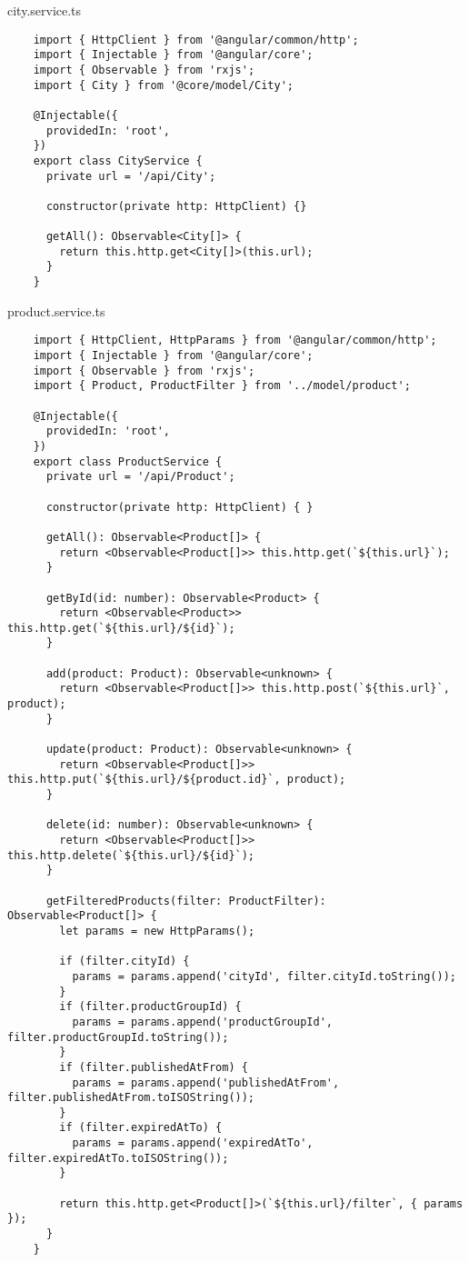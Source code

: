 city.service.ts
\begin{lstlisting}
    import { HttpClient } from '@angular/common/http';
    import { Injectable } from '@angular/core';
    import { Observable } from 'rxjs';
    import { City } from '@core/model/City';
    
    @Injectable({
      providedIn: 'root',
    })
    export class CityService {
      private url = '/api/City';
    
      constructor(private http: HttpClient) {}
    
      getAll(): Observable<City[]> {
        return this.http.get<City[]>(this.url);
      }
    }
\end{lstlisting}

product.service.ts
\begin{lstlisting}
    import { HttpClient, HttpParams } from '@angular/common/http';
    import { Injectable } from '@angular/core';
    import { Observable } from 'rxjs';
    import { Product, ProductFilter } from '../model/product';
    
    @Injectable({
      providedIn: 'root',
    })
    export class ProductService {
      private url = '/api/Product';
    
      constructor(private http: HttpClient) { }
    
      getAll(): Observable<Product[]> {
        return <Observable<Product[]>> this.http.get(`${this.url}`);
      }
    
      getById(id: number): Observable<Product> {
        return <Observable<Product>> this.http.get(`${this.url}/${id}`);
      }
    
      add(product: Product): Observable<unknown> {
        return <Observable<Product[]>> this.http.post(`${this.url}`, product);
      }
    
      update(product: Product): Observable<unknown> {
        return <Observable<Product[]>> this.http.put(`${this.url}/${product.id}`, product);
      }
    
      delete(id: number): Observable<unknown> {
        return <Observable<Product[]>> this.http.delete(`${this.url}/${id}`);
      }
    
      getFilteredProducts(filter: ProductFilter): Observable<Product[]> {
        let params = new HttpParams();
    
        if (filter.cityId) {
          params = params.append('cityId', filter.cityId.toString());
        }
        if (filter.productGroupId) {
          params = params.append('productGroupId', filter.productGroupId.toString());
        }
        if (filter.publishedAtFrom) {
          params = params.append('publishedAtFrom', filter.publishedAtFrom.toISOString());
        }
        if (filter.expiredAtTo) {
          params = params.append('expiredAtTo', filter.expiredAtTo.toISOString());
        }
    
        return this.http.get<Product[]>(`${this.url}/filter`, { params });
      }
    }
\end{lstlisting}

